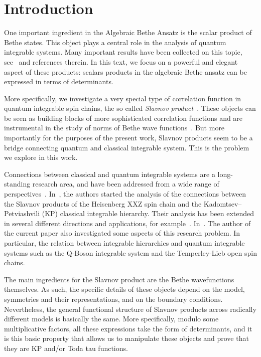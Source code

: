 \documentclass[a4paper,12pt]{amsart}
\begin{document}
\setcounter{tocdepth}{1}
\tableofcontents


\section{Introduction}

One important ingredient in the Algebraic Bethe Ansatz is the scalar
product of Bethe states. This object plays a central role in the
analysis of quantum integrable systems. Many important results have
been collected on this topic, see~\cite{Korepin:1993kvr} and
references therein. In this text, we focus on a powerful and elegant
aspect of these products: scalars products in the algebraic Bethe
ansatz can be expressed in terms of determinants.

More specifically, we investigate a very special type of correlation
function in quantum integrable spin chains, the so called
\emph{Slavnov product}~\cite{Slavnov1989}. These objects can be seen
as building blocks of more sophisticated correlation functions and are
instrumental in the study of norms of Bethe wave
functions~\cite{Korepin:1993kvr}. But more importantly for the
purposes of the present work, Slavnov products seem to be a bridge
connecting quantum and classical integrable system. This is the
problem we explore in this work.

Connections between classical and quantum integrable systems are a
long-standing research area, and have been addressed from a wide range
of perspectives~\cite{Wu:1975mw, Its:1992bj, korepin2000the, Foda2009,
  Alexandrov:2011aa}.  In~\cite{Foda:2009zz}, the authors started the
analysis of the connections between the Slavnov products of the
Heisenberg XXZ spin chain and the Kadomtsev–Petviashvili (KP)
classical integrable hierarchy. Their analysis has been extended in
several different directions and applications, for
example~\cite{Wheeler:2010vmq, Foda:2010, Takasaki:2010qm,
  Foda:2012wn, Foda:2012wf}.  In~\cite{Araujo:2021ghu,
  Araujo:2024klz}. The author of the current paper also investigated
some aspects of this research problem. In particular, the relation
between integrable hierarchies and quantum integrable systems such as
the Q-Boson integrable system and the Temperley-Lieb open spin chains.

The main ingredients for the Slavnov product are the Bethe
wavefunctions themselves. As such, the specific details of these
objects depend on the model, symmetries and their representations, and
on the boundary conditions. Nevertheless, the general
functional structure of Slavnov products across radically
different models is basically the same. More specifically, modulo some
multiplicative factors, all these expressions take the form of
determinants, and it is this basic property that allows us to
manipulate these objects and prove that they are KP and/or Toda tau
functions.
\end{document}
